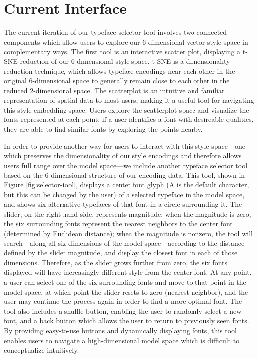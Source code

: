 \section{Current Interface}

The current iteration of our typeface selector tool involves two connected components which allow users to explore our 6-dimensional vector style space in complementary ways. The first tool is an interactive scatter plot, displaying a t-SNE reduction of our 6-dimensional style space. t-SNE \cite{vandermaaten2008} is a dimensionality reduction technique, which allows typeface encodings near each other in the original 6-dimensional space to generally remain close to each other in the reduced 2-dimensional space. The scatterplot is an intuitive and familiar representation of spatial data to most users, making it a useful tool for navigating this style-embedding space. Users explore the scatterplot space and visualize the fonts represented at each point; if a user identifies a font with desireable qualities, they are able to find similar fonts by exploring the points nearby.

In order to provide another way for users to interact with this style space—one which preserves the dimensionality of our style encodings and therefore allows users full range over the model space—we include another typeface selector tool based on the 6-dimensional structure of our encoding data. This tool, shown in Figure \ref{fig:selector-tool}, displays a center font glyph (A is the default character, but this can be changed by the user) of a selected typeface in the model space, and shows six alternative typefaces of that font in a circle surrounding it. The slider, on the right hand side, represents magnitude; when the magnitude is zero, the six surrounding fonts represent the nearest neighbors to the center font (determined by Euclidean distance); when the magnitude is nonzero, the tool will search—along all six dimensions of the model space—according to the distance defined by the slider magnitude, and display the closest font in each of those dimensions. Therefore, as the slider grows further from zero, the six fonts displayed will have increasingly different style from the center font. At any point, a user can select one of the six surrounding fonts and move to that point in the model space, at which point the slider resets to zero (nearest neighbor), and the user may continue the process again in order to find a more optimal font. The tool also includes a shuffle button, enabling the user to randomly select a new font, and a back button which allows the user to return to previously seen fonts. By providing easy-to-use buttons and dynamically displaying fonts, this tool enables users to navigate a high-dimensional model space which is difficult to conceptualize intuitively.

